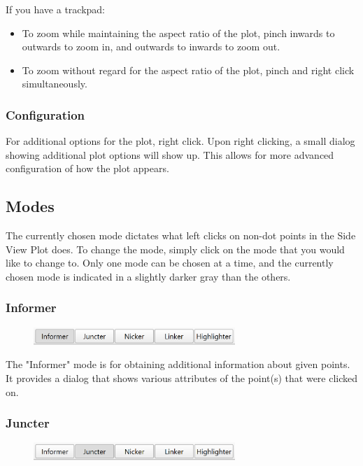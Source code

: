 \documentclass[titlepage]{article}
\begin{document}
	If you have a trackpad:
	\begin{itemize}
		\item To zoom while maintaining the aspect ratio of the plot, pinch inwards to outwards to zoom in, and outwards to inwards to zoom out.
		\item To zoom without regard for the aspect ratio of the plot, pinch and right click simultaneously. 
	\end{itemize}

	\subsubsection{Configuration}
	For additional options for the plot, right click. Upon right clicking, a small dialog showing additional plot options will show up. This allows for more advanced configuration of how the plot appears.
	
	\subsection{Modes}
	The currently chosen mode dictates what left clicks on non-dot points in the Side View Plot does. To change the mode, simply click on the mode that you would like to change to. Only one mode can be chosen at a time, and the currently chosen mode is indicated in a slightly darker gray than the others.
	
	\subsubsection{Informer}
	
	\begin{figure}[h]
		\centering
		\includegraphics[width=3in]{"informer-activated.png"}
		\label{fig:informer-activated}
	\end{figure}

	The "Informer" mode is for obtaining additional information about given points. It provides a dialog that shows various attributes of the point(s) that were clicked on.

	\subsubsection{Juncter}

	\begin{figure}[h]
		\centering
		\includegraphics[width=3in]{"juncter-activated.png"}
		\label{fig:juncter-activated}
	\end{figure}
\end{document}

